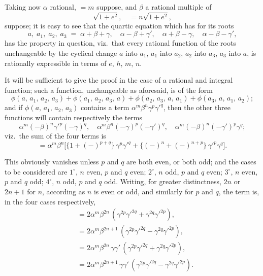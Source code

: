 \documentclass[11pt]{article}
\begin{document}
Taking now $\alpha$ rational, $= m$ suppose, and $\beta$ a rational multiple of
\[
   \sqrt{1 + e^2},\quad = n\sqrt{1 + e^2},
\]
suppose; it is easy to see that the quartic equation which has for its roots
\[
   a,\; a_1,\; a_2,\; a_3 \;=\; \alpha + \beta + \gamma,\quad \alpha - \beta + \gamma',\quad \alpha + \beta - \gamma,\quad \alpha - \beta - \gamma',
\]
has the property in question, viz.\ that every rational function of the roots unchangeable
by the cyclical change $a$ into $a_1$, $a_1$ into $a_2$, $a_2$ into $a_3$, $a_3$ into $a$, is rationally
expressible in terms of $e$, $h$, $m$, $n$.

It will be sufficient to give the proof in the case of a rational and integral
function; such a function, unchangeable as aforesaid, is of the form
\[
   \phi(a,\, a_1,\, a_2,\, a_3) + \phi(a_1,\, a_2,\, a_3,\, a) + \phi(a_2,\, a_3,\, a,\, a_1) + \phi(a_3,\, a,\, a_1,\, a_2);
\]
and if $\phi(a,\, a_1,\, a_2,\, a_3)$ contains a term $\alpha^m \beta^n \gamma^p \gamma'^q$, then the other three functions will
contain respectively the terms
\[
   \alpha^m(-\beta)^n \gamma'^p (-\gamma)^q,\quad \alpha^m \beta^n (-\gamma)^p (-\gamma')^q,\quad \alpha^m(-\beta)^n (-\gamma')^p \gamma^q;
\]
viz.\ the sum of the four terms is
\[
   = \alpha^m \beta^n \bigl[\{1 + (-)^{p+q}\}\,\gamma^p \gamma'^q + \{(-)^n + (-)^{n+p}\}\,\gamma'^p \gamma^q\bigr].
\]

This obviously vanishes unless $p$ and $q$ are both even, or both odd; and the
cases to be considered are $1^\circ$, $n$ even, $p$ and $q$ even; $2^\circ$, $n$ odd, $p$ and $q$ even;
$3^\circ$, $n$ even, $p$ and $q$ odd; $4^\circ$, $n$ odd, $p$ and $q$ odd. Writing, for greater distinctness,
$2n$ or $2n+1$ for $n$, according as $n$ is even or odd, and similarly for $p$ and $q$, the
term is, in the four cases respectively,
\begin{align*}
   &= 2\alpha^m \beta^{2n}\,(\gamma^{2p}\gamma'^{2q} + \gamma^{2q}\gamma'^{2p}),\\
   &= 2\alpha^m \beta^{2n+1}\,(\gamma^{2p}\gamma'^{2q} - \gamma^{2q}\gamma'^{2p}),\\
   &= 2\alpha^m \beta^{2n}\,\gamma\gamma'\,(\gamma^{2p}\gamma'^{2q} + \gamma^{2q}\gamma'^{2p}),\\
   &= 2\alpha^m \beta^{2n+1}\,\gamma\gamma'\,(\gamma^{2p}\gamma'^{2q} - \gamma^{2q}\gamma'^{2p}).
\end{align*}
\end{document}
